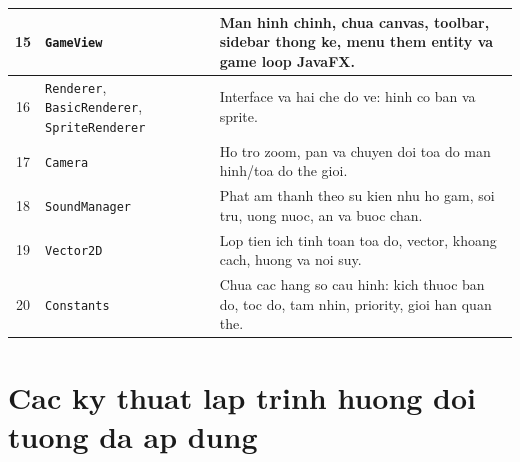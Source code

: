 \documentclass[12pt,a4paper]{article}
\begin{document}
\begin{longtable}{|c|p{4cm}|p{8cm}|}
    \hline
    15 & \texttt{GameView} & Man hinh chinh, chua canvas, toolbar, sidebar thong ke, menu them entity va game loop JavaFX. \\
    \hline
    16 & \texttt{Renderer}, \texttt{BasicRenderer}, \texttt{SpriteRenderer} & Interface va hai che do ve: hinh co ban va sprite. \\
    \hline
    17 & \texttt{Camera} & Ho tro zoom, pan va chuyen doi toa do man hinh/toa do the gioi. \\
    \hline
    18 & \texttt{SoundManager} & Phat am thanh theo su kien nhu ho gam, soi tru, uong nuoc, an va buoc chan. \\
    \hline
    19 & \texttt{Vector2D} & Lop tien ich tinh toan toa do, vector, khoang cach, huong va noi suy. \\
    \hline
    20 & \texttt{Constants} & Chua cac hang so cau hinh: kich thuoc ban do, toc do, tam nhin, priority, gioi han quan the. \\
    \hline
\end{longtable}

\section{Cac ky thuat lap trinh huong doi tuong da ap dung}
\end{document}

